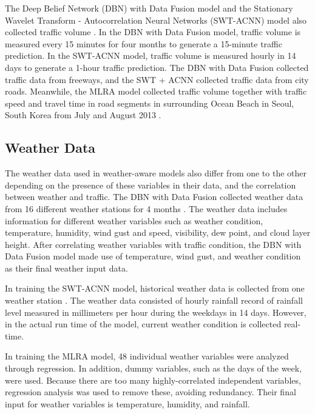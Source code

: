 The Deep Belief Network (DBN) with Data Fusion model and the Stationary Wavelet Transform - Autocorrelation Neural Networks (SWT-ACNN) model also collected traffic volume . In the DBN with Data Fusion model, traffic volume is measured every 15 minutes for four months to generate a 15-minute traffic prediction. In the SWT-ACNN model, traffic volume is measured hourly in 14 days to generate a 1-hour traffic prediction. The DBN with Data Fusion collected traffic data from freeways, and the SWT + ACNN collected traffic data from city roads. Meanwhile, the MLRA model collected traffic volume together with traffic speed and travel time in road segments in surrounding Ocean Beach in Seoul, South Korea from July and August 2013 . 

\subsection{Weather Data}
The weather data used in weather-aware models also differ from one to the other depending on the presence of these variables in their data, and the correlation between weather and traffic. The DBN with Data Fusion collected weather data from 16 different weather stations for 4 months . The weather data includes information for different weather variables such as weather condition, temperature, humidity, wind gust and speed, visibility, dew point, and cloud layer height. After correlating weather variables with traffic condition, the DBN with Data Fusion model made use of temperature, wind gust, and weather condition as their final weather input data.

In training the SWT-ACNN model, historical weather data is collected from one weather station . The weather data consisted of hourly rainfall record of rainfall level measured in millimeters per hour during the weekdays in 14 days. However, in the actual run time of the model, current weather condition is collected real-time.

In training the MLRA model, 48 individual weather variables were analyzed through regression. In addition, dummy variables, such as the days of the week, were used. Because there are too many highly-correlated independent variables, regression analysis was used to remove these, avoiding redundancy. Their final input for weather variables is temperature, humidity, and rainfall. 




